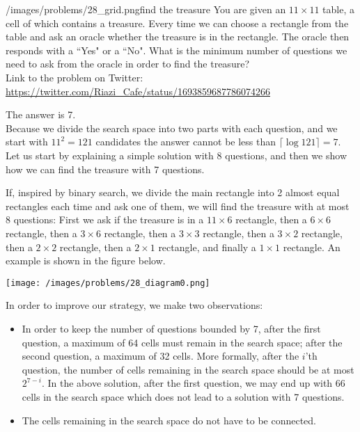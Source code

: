 \begin{problem}{/images/problems/28_grid.png}{find the treasure}
	You are given an $11 \times 11$ table, a cell of which contains a treasure. Every time we can choose a  rectangle from the table and ask an oracle whether the treasure is in the rectangle. The oracle then responds with a ``Yes" or a ``No". What is the minimum number of questions we need to ask from the oracle in order to find the treasure?\\[0.2cm]

Link to the problem on Twitter:  \url{https://twitter.com/Riazi_Cafe/status/1693859687786074266}
\end{problem}
\begin{solution}
The answer is 7.\\[0.2cm]

Because we divide the search space into two parts with each question, and we start with $11^2 = 121$ candidates the answer cannot be less than $\lceil \log 121\rceil=7$. Let us start by explaining a simple solution with 8 questions, and then we show how we can find the treasure with 7 questions.

If, inspired by binary search, we divide the main rectangle into 2 almost equal rectangles each time and ask one of them, we will find the treasure with at most 8 questions: First we ask if the treasure is in a  $11\times 6$ rectangle, then a $6\times 6$ rectangle, then a $3 \times 6$ rectangle, then a $3 \times 3$ rectangle, then a $3 \times 2$ rectangle, then a $2 \times 2$ rectangle, then a $2 \times 1$ rectangle, and finally a $1 \times 1$ rectangle. An example is shown in the figure below.

\begin{center}
	\texttt{[image: /images/problems/28\_diagram0.png]}
\end{center}

In order to improve our strategy, we make two observations:
\begin{itemize}
\item In order to keep the number of questions bounded by 7, after the first question, a maximum of 64 cells must remain in the search space; after the second question, a maximum of 32 cells. More formally, after the $i$'th question, the number of cells remaining in the search space should be at most $2^{7-i}$. In the above solution, after the first question, we may end up with 66 cells in the search space which does not lead to a solution with 7 questions.
\item The cells remaining in the search space do not have to be connected.
\end{itemize}


\end{solution}
